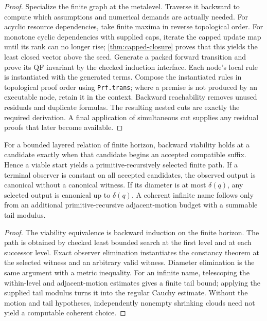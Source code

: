 \begin{proof}
Specialize the finite graph at the metalevel.  Traverse it backward to compute which assumptions and numerical demands are actually needed.  For acyclic resource dependencies, take finite maxima in reverse topological order.  For monotone cyclic dependencies with supplied caps, iterate the capped update map until its rank can no longer rise; \cref{thm:capped-closure} proves that this yields the least closed vector above the seed.  Generate a packed forward transition and prove its QF invariant by the checked induction interface.  Each node's local rule is instantiated with the generated terms.  Compose the instantiated rules in topological proof order using \texttt{Prf.trans}; where a premise is not produced by an executable node, retain it in the context.  Backward reachability removes unused residuals and duplicate formulas.  The resulting nested cuts are exactly the required derivation.  A final application of simultaneous cut supplies any residual proofs that later become available.
\end{proof}

\begin{theorem}\label{thm:finite-rel-main}
For a bounded layered relation of finite horizon, backward viability holds at a candidate exactly when that candidate begins an accepted compatible suffix.  Hence a viable start yields a primitive-recursively selected finite path.  If a terminal observer is constant on all accepted candidates, the observed output is canonical without a canonical witness.  If its diameter is at most \(\delta(q)\), any selected output is canonical up to \(\delta(q)\).  A coherent infinite name follows only from an additional primitive-recursive adjacent-motion budget with a summable tail modulus.
\end{theorem}

\begin{proof}
The viability equivalence is backward induction on the finite horizon.  The path is obtained by checked least bounded search at the first level and at each successor level.  Exact observer elimination instantiates the constancy theorem at the selected witness and an arbitrary valid witness.  Diameter elimination is the same argument with a metric inequality.  For an infinite name, telescoping the within-level and adjacent-motion estimates gives a finite tail bound; applying the supplied tail modulus turns it into the regular Cauchy estimate.  Without the motion and tail hypotheses, independently nonempty shrinking clouds need not yield a computable coherent choice.
\end{proof}


